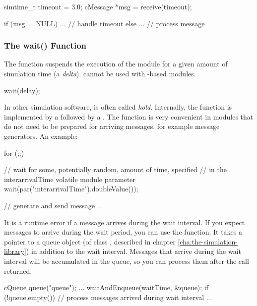 \begin{cpp}
simtime_t timeout = 3.0;
cMessage *msg = receive(timeout);

if (msg==NULL)
{
    ...   // handle timeout
}
else
{
    ...  // process message
}
\end{cpp}

\subsubsection{The wait() Function}
\label{sec:simple-modules:wait}

The  function suspends the execution of the module for a
given amount of simulation time (a \textit{delta}).  cannot
be used with -based modules.

\begin{cpp}
wait(delay);
\end{cpp}

In other simulation software,  is often called \textit{hold}.
Internally, the  function is implemented by a
 followed by a .
The  function is very convenient in modules that do not need
to be prepared for arriving messages, for example message generators.
An example:

\begin{cpp}
for (;;)
{
    // wait for some, potentially random, amount of time, specified
    // in the interarrivalTime volatile module parameter
    wait(par("interarrivalTime").doubleValue());

    // generate and send message
    ...
}
\end{cpp}

It is a runtime error if a message arrives during the wait interval.
If you expect messages to arrive during the wait period, you can
use the  function. It takes a pointer to a queue object
(of class , described in chapter \ref{cha:the-simulation-library})
in addition to the wait interval. Messages that arrive during the
wait interval will be accumulated in the queue, so you can
process them after the  call returned.

\begin{cpp}
cQueue queue("queue");
...
waitAndEnqueue(waitTime, &queue);
if (!queue.empty())
{
    // process messages arrived during wait interval
    ...
}
\end{cpp}


